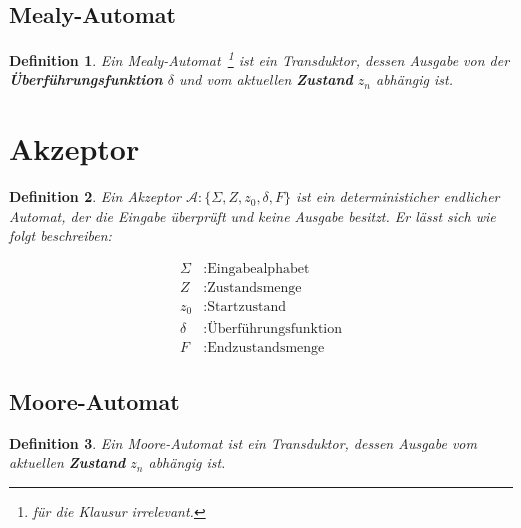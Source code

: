 \documentclass[12pt, oneside]{book}
\newtheorem{definition}{Definition}
\begin{document}
\subsection{Mealy-Automat}
\begin{definition}
    Ein Mealy-Automat\ \footnote{für die Klausur irrelevant.} ist ein Transduktor, dessen Ausgabe von der \textbf{Überführungsfunktion} $\delta$ und vom aktuellen \textbf{Zustand} $z_n$ abhängig ist.
\end{definition}
%
\section{Akzeptor}
\begin{definition}
Ein Akzeptor $\mathcal{A}: \{\Sigma, Z, z_{0}, \delta, F\}$ ist ein deterministicher endlicher Automat, der die Eingabe überprüft und keine Ausgabe besitzt. Er lässt sich wie folgt beschreiben:
\end{definition}
    \begin{align*}
    \Sigma &: \text{Eingabealphabet}\\
    Z &: \text{Zustandsmenge}\\
    z_{0} &: \text{Startzustand}\\
    \delta &: \text{Überführungsfunktion}\\
    F &: \text{Endzustandsmenge}
\end{align*}
%
\subsection{Moore-Automat}
\begin{definition}
    Ein Moore-Automat ist ein Transduktor, dessen Ausgabe vom aktuellen \textbf{Zustand} $z_n$ abhängig ist.
\end{definition}
\end{document}

